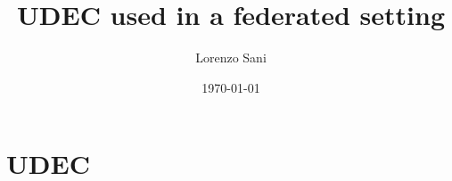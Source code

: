\documentclass{beamer}
\title[Unsupervised Clustering in Federated Learning]{UDEC used in a federated setting}
\author{Lorenzo Sani}
\institute{Università degli Studi di Bologna}
\date{\today}
\begin{document}
\begin{frame}
  \titlepage
\end{frame}




\section{UDEC}
\end{document}
